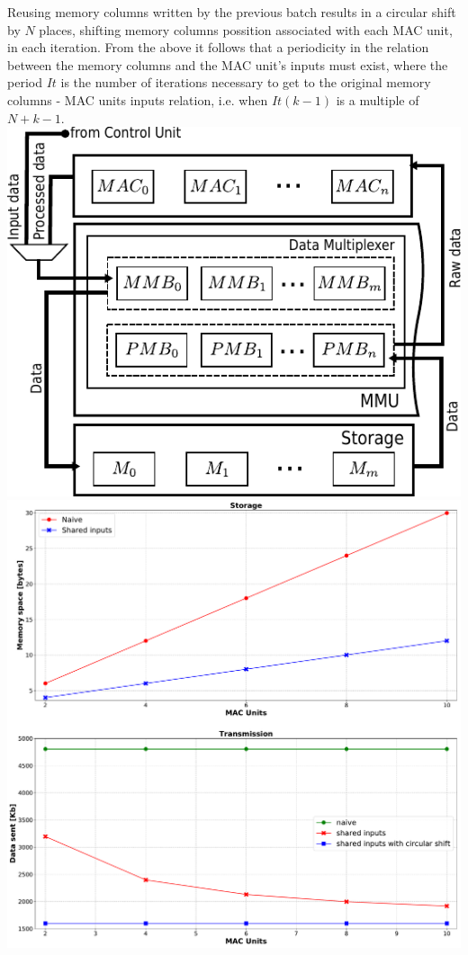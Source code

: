 \documentclass[a1paper,portrait,fontscale=0.43]{baposter}
\begin{document}
\begin{poster}
{\begin{multicols}{2}
Reusing memory columns written by the previous batch results in
a circular shift by $N$ places, shifting memory columns possition associated with each
MAC unit, in each iteration.
From the above it
follows that a periodicity in the relation
between the memory columns and the
MAC unit's inputs must exist, where the period $It$ is the number of
iterations necessary to get to the original memory columns - MAC units
inputs relation, i.e. when $It(k-1)$ is a multiple of $N+k-1$. 
\vfill\null
\columnbreak
\hfill \break
\includegraphics[width=\linewidth]{muxes}
\hfill \break
\includegraphics[width=\linewidth]{datas_mems}
\end{multicols}
\vspace{-0.43cm}
}


\end{poster}
\end{document}
